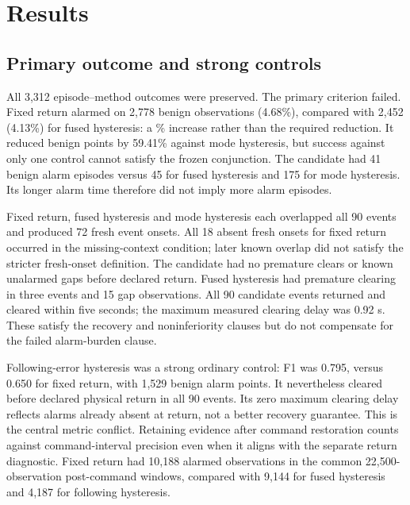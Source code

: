 \section{Results}
\subsection{Primary outcome and strong controls}
All 3,312 episode--method outcomes were preserved. The primary criterion failed. Fixed return alarmed on 2,778 benign observations (4.68\%), compared with 2,452 (4.13\%) for fused hysteresis: a \RelativeIncrease\% increase rather than the required reduction. It reduced benign points by 59.41\% against mode hysteresis, but success against only one control cannot satisfy the frozen conjunction. The candidate had 41 benign alarm episodes versus 45 for fused hysteresis and 175 for mode hysteresis. Its longer alarm time therefore did not imply more alarm episodes.

\begin{table}[htbp]\centering\small
\caption{Selected controls and candidate on the fresh pooled population. Overlap/fresh counts have denominator 90; early denotes events with premature clearing. Full roster appears in Appendix~\ref{app:all}.}
\label{tab:main}
\end{table}

Fixed return, fused hysteresis and mode hysteresis each overlapped all 90 events and produced 72 fresh event onsets. All 18 absent fresh onsets for fixed return occurred in the missing-context condition; later known overlap did not satisfy the stricter fresh-onset definition. The candidate had no premature clears or known unalarmed gaps before declared return. Fused hysteresis had premature clearing in three events and 15 gap observations. All 90 candidate events returned and cleared within five seconds; the maximum measured clearing delay was 0.92 s. These satisfy the recovery and noninferiority clauses but do not compensate for the failed alarm-burden clause.

Following-error hysteresis was a strong ordinary control: F1 was 0.795, versus 0.650 for fixed return, with 1,529 benign alarm points. It nevertheless cleared before declared physical return in all 90 events. Its zero maximum clearing delay reflects alarms already absent at return, not a better recovery guarantee. This is the central metric conflict. Retaining evidence after command restoration counts against command-interval precision even when it aligns with the separate return diagnostic. Fixed return had 10,188 alarmed observations in the common 22,500-observation post-command windows, compared with 9,144 for fused hysteresis and 4,187 for following hysteresis.

